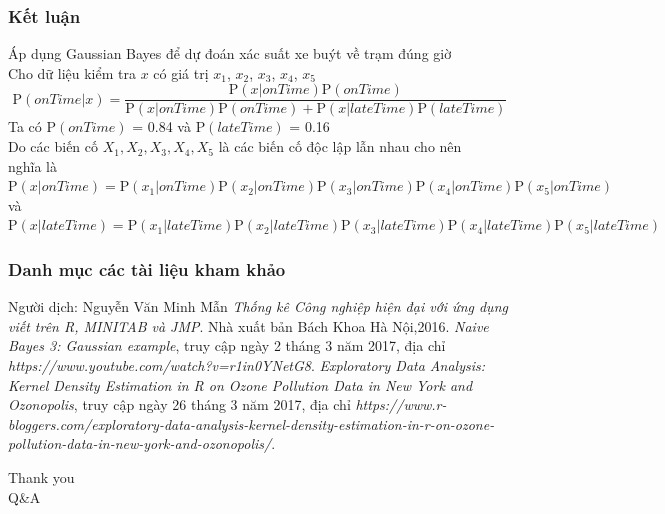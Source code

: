\documentclass[t]{beamer}
\begin{document}
\begin{frame}
\frametitle{Kết luận}
Áp dụng Gaussian Bayes để dự đoán xác suất xe buýt về trạm đúng giờ\\
Cho dữ liệu kiểm tra $x$ có giá trị $x_1$, $x_2$, $x_3$, $x_4$, $x_5$\\
\[
\mathrm{P}(onTime|x) = \frac{\mathrm{P}(x|onTime)\mathrm{P}(onTime)}{\mathrm{P}(x|onTime)\mathrm{P}(onTime)+\mathrm{P}(x|lateTime)\mathrm{P}(lateTime)}
\]
Ta có $\mathrm{P}(onTime)$ = 0.84 và $\mathrm{P}(lateTime)$ = 0.16\\
Do các biến cố $X_1, X_2, X_3, X_4, X_5$ là các biến cố độc lập lẫn nhau cho nên\\
nghĩa là $\mathrm{P}(x|onTime) = \mathrm{P}(x_1|onTime)\mathrm{P}(x_2|onTime)\mathrm{P}(x_3|onTime)\mathrm{P}(x_4|onTime)\mathrm{P}(x_5|onTime)$ \\
và $\mathrm{P}(x|lateTime) = \mathrm{P}(x_1|lateTime)\mathrm{P}(x_2|lateTime)\mathrm{P}(x_3|lateTime)\mathrm{P}(x_4|lateTime)\mathrm{P}(x_5|lateTime)$
\end{frame}
\begin{frame}
\frametitle{Danh mục các tài liệu kham khảo}
\begin{thebibliography}{}
 Người dịch: Nguyễn Văn Minh Mẫn \emph{Thống kê Công nghiệp hiện đại với ứng dụng viết trên R, MINITAB và JMP}. Nhà xuất bản Bách Khoa Hà Nội,2016.
	\emph{Naive Bayes 3: Gaussian example}, truy cập ngày 2 tháng 3 năm 2017,
	địa chỉ \emph{https://www.youtube.com/watch?v=r1in0YNetG8}.	
	\emph{Exploratory Data Analysis: Kernel Density Estimation in R on Ozone Pollution Data in New York and Ozonopolis}, truy cập ngày 26 tháng 3 năm 2017,
	địa chỉ \emph{https://www.r-bloggers.com/exploratory-data-analysis-kernel-density-estimation-in-r-on-ozone-pollution-data-in-new-york-and-ozonopolis/}.
\end{thebibliography}
\end{frame}

\begin{frame}[c]{ }
\begin{Huge}
\centering
Thank you\\Q\&A\\
\end{Huge}
\end{frame}
\end{document}
